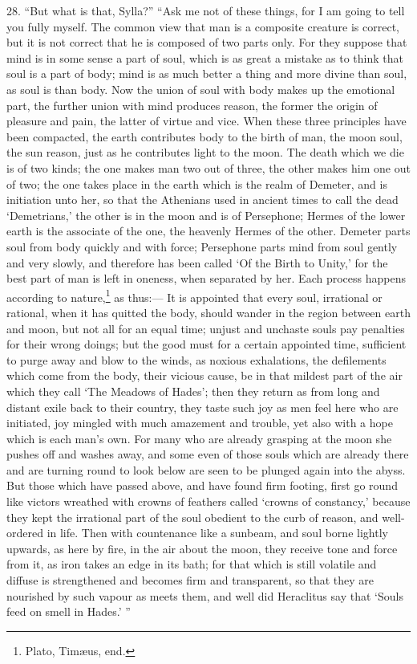 \documentclass[a4paper, 11pt, oneside, polutonikogreek, english]{article}
\begin{document}
28. ``But what is that, Sylla?'' ``Ask me not of these things, for I am going to tell you fully myself. The common view that man is a composite creature is correct, but it is not correct that he is composed of two parts only. For they suppose that mind is in some sense a part of soul, which is as great a mistake as to think that soul is a part of body; mind is as much better a thing and more divine than soul, as soul is than body. Now the union of soul with body makes up the emotional part, the further union with mind produces reason, the former the origin of pleasure and pain, the latter of virtue and vice. When these three principles have been compacted, the earth contributes body to the birth of man, the moon soul, the sun reason, just as he contributes light to the moon. The death which we die is of two kinds; the one makes man two out of three, the other makes him one out of two; the one takes place in the earth which is the realm of Demeter, and is initiation unto her, so that the Athenians used in ancient times to call the dead `Demetrians,' the other is in the moon and is of Persephone; Hermes of the lower earth is the associate of the one, the heavenly Hermes of the other. Demeter parts soul from body quickly and with force; Persephone parts mind from soul gently and very slowly, and therefore has been called `Of the Birth to Unity,' for the best part of man is left in oneness, when separated by her. Each process happens according to nature,\footnote{Plato, Timæus, end.} as thus:--- It is appointed that every soul, irrational or rational, when it has quitted the body, should wander in the region between earth and moon, but not all for an equal time; unjust and unchaste souls pay penalties for their wrong doings; but the good must for a certain appointed time, sufficient to purge away and blow to the winds, as noxious exhalations, the defilements which come from the body, their vicious cause, be in that mildest part of the air which they call `The Meadows of Hades'; then they return as from long and distant exile back to their country, they taste such joy as men feel here who are initiated, joy mingled with much amazement and trouble, yet also with a hope which is each man's own. For many who are already grasping at the moon she pushes off and washes away, and some even of those souls which are already there and are turning round to look below are seen to be plunged again into the abyss. But those which have passed above, and have found firm footing, first go round like victors wreathed with crowns of feathers called `crowns of constancy,' because they kept the irrational part of the soul obedient to the curb of reason, and well-ordered in life. Then with countenance like a sunbeam, and soul borne lightly upwards, as here by fire, in the air about the moon, they receive tone and force from it, as iron takes an edge in its bath; for that which is still volatile and diffuse is strengthened and becomes firm and transparent, so that they are nourished by such vapour as meets them, and well did Heraclitus say that `Souls feed on smell in Hades.' ''
\end{document}
